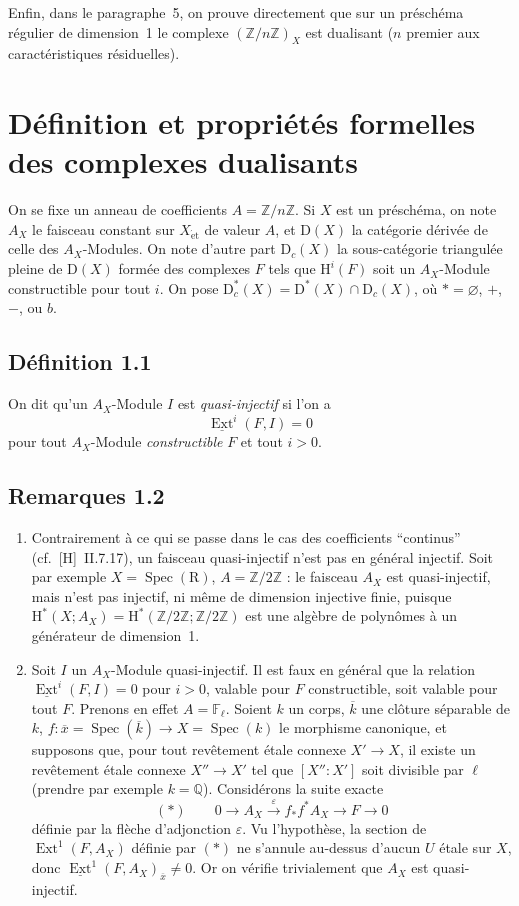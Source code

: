 \documentclass[11pt]{article}
\renewcommand{\H}{\mathrm{H}}
\DeclareMathOperator{\Ext}{Ext}
\DeclareMathOperator{\Spec}{Spec}
\newcommand{\R}{\mathrm{R}}
\newcommand{\D}{\mathrm{D}}
\newcommand{\Z}{\mathbb{Z}}
\newcommand{\F}{\mathbb{F}}
\newcommand{\Q}{\mathbb{Q}}
\newcommand{\ol}[1]{\overline{#1}}
\providecommand{\R}{\mathrm R}
\providecommand{\Z}{\mathbb Z}
\providecommand{\Spec}{\operatorname{Spec}}
\providecommand{\Spec}{\operatorname{Spec}}
\providecommand{\Spec}{\operatorname{Spec}}
\providecommand{\Spec}{\operatorname{Spec}}
\begin{document}
Enfin, dans le paragraphe~5, on prouve directement que sur un préschéma régulier de dimension~1 le complexe $(\Z/n\Z)_X$ est dualisant ($n$ premier aux caractéristiques résiduelles).

\section{Définition et propriétés formelles des complexes dualisants}

On se fixe un anneau de coefficients $A = \Z/n\Z$. Si $X$ est un préschéma, on note $A_X$ le faisceau constant sur $X_{\mathrm{\acute{e}t}}$ de valeur $A$, et $\D(X)$ la catégorie dérivée de celle des $A_X$-Modules. On note d'autre part $\D_c(X)$ la sous-catégorie triangulée pleine de $\D(X)$ formée des complexes $F$ tels que $\H^i(F)$ soit un $A_X$-Module constructible pour tout $i$. On pose $\D_c^{*}(X) = \D^{*}(X) \cap \D_c(X)$, où $* = \varnothing$, $+$, $-$, ou $b$.

\subsection*{Définition 1.1}
On dit qu'un $A_X$-Module $I$ est \emph{quasi-injectif} si l'on a
\[
\underline{\Ext}^i(F,I) = 0
\]
pour tout $A_X$-Module \emph{constructible} $F$ et tout $i > 0$.

\subsection*{Remarques 1.2}
\begin{enumerate}[label=\alph*)]
\item Contrairement à ce qui se passe dans le cas des coefficients ``continus'' (cf.~[H]~II.7.17), un faisceau quasi-injectif n'est pas en général injectif. Soit par exemple $X = \Spec(\R)$, $A = \Z/2\Z$ : le faisceau $A_X$ est quasi-injectif, mais n'est pas injectif, ni même de dimension injective finie, puisque $\H^{*}(X; A_X) = \H^{*}(\Z/2\Z; \Z/2\Z)$ est une algèbre de polynômes à un générateur de dimension~1.

\item Soit $I$ un $A_X$-Module quasi-injectif. Il est faux en général que la relation $\underline{\Ext}^i(F,I) = 0$ pour $i > 0$, valable pour $F$ constructible, soit valable pour tout $F$. Prenons en effet $A = \F_{\ell}$. Soient $k$ un corps, $\ol{k}$ une clôture séparable de $k$, $f : \ol{x} = \Spec(\ol{k}) \to X = \Spec(k)$ le morphisme canonique, et supposons que, pour tout revêtement étale connexe $X' \to X$, il existe un revêtement étale connexe $X'' \to X'$ tel que $[X'':X']$ soit divisible par $\ell$ (prendre par exemple $k = \Q$). Considérons la suite exacte
\[
(*) \qquad 0 \longrightarrow A_X \xrightarrow{\;\varepsilon\;} f_{*}f^{*}A_X \longrightarrow F \longrightarrow 0
\]
définie par la flèche d'adjonction $\varepsilon$. Vu l'hypothèse, la section de $\Ext^1(F,A_X)$ définie par $(*)$ ne s'annule au-dessus d'aucun $U$ étale sur $X$, donc $\underline{\Ext}^1(F,A_X)_{\ol{x}} \neq 0$. Or on vérifie trivialement que $A_X$ est quasi-injectif.
\end{enumerate}
\end{document}
